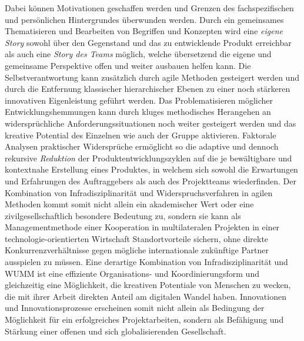 \documentclass[a4paper,11pt]{article}
\begin{document}
Dabei können Motivationen geschaffen werden und Grenzen des fachspezifischen
und persönlichen Hintergrundes überwunden werden. Durch ein gemeinsames
Thematisieren und Bearbeiten von Begriffen und Konzepten wird eine
\emph{eigene Story} sowohl über den Gegenstand und das zu entwicklende Produkt
erreichbar als auch eine \emph{Story des Teams} möglich, welche übersetzend
die eigene und gemeinsame Perspektive offen und weiter ausbauen helfen
kann. Die Selbstverantwortung kann zusätzlich durch agile Methoden gesteigert
werden und durch die Entfernung klassischer hierarchischer Ebenen zu einer
noch stärkeren innovativen Eigenleistung geführt werden. Das Problematisieren
möglicher Entwicklungshemmungen kann durch kluges methodisches Herangehen an
widersprüchliche Anforderungssituationen noch weiter gesteigert werden und das
kreative Potential des Einzelnen wie auch der Gruppe aktivieren. Faktorale
Analysen praktischer Widersprüche ermöglicht so die adaptive und dennoch
rekursive \emph{Reduktion} der Produktentwicklungszyklen auf die je
bewältigbare und kontextnahe Erstellung eines Produktes, in welchem sich
sowohl die Erwartungen und Erfahrungen des Auftraggebers als auch des
Projektteams wiederfinden.  Der Kombination von Infradisziplinarität und
Widerspruchsverfahren in agilen Methoden kommt somit nicht allein ein
akademischer Wert oder eine zivilgesellschaftlich besondere Bedeutung zu,
sondern sie kann als Managementmethode einer Kooperation in multilateralen
Projekten in einer technologie-orientierten Wirtschaft Standortvorteile
sichern, ohne direkte Konkurrenzverhältnisse gegen mögliche internationale
zukünftige Partner ausspielen zu müssen. Eine derartige Kombination von
Infradisziplinarität und WUMM ist eine effiziente Organisations- und
Koordinierungsform und gleichzeitig eine Möglichkeit, die kreativen Potentiale
von Menschen zu wecken, die mit ihrer Arbeit direkten Anteil am digitalen
Wandel haben. Innovationen und Innovationsprozesse erscheinen somit nicht
allein als Bedingung der Möglichkeit für ein erfolgreiches Projektarbeiten,
sondern als Befähigung und Stärkung einer offenen und sich globalisierenden
Gesellschaft.
\end{document}
